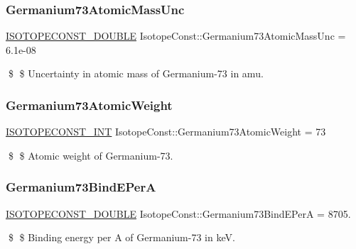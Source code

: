 \subsubsection{\texorpdfstring{Germanium73\+Atomic\+Mass\+Unc}{Germanium73AtomicMassUnc}}
{\footnotesize\ttfamily \mbox{\hyperlink{group___isotope_const-_macros_ga8f45a7272ce02c0b4c65c44636ed719a}{I\+S\+O\+T\+O\+P\+E\+C\+O\+N\+S\+T\+\_\+\+D\+O\+U\+B\+LE}} Isotope\+Const\+::\+Germanium73\+Atomic\+Mass\+Unc = 6.\+1e-\/08}

\$ \$ Uncertainty in atomic mass of Germanium-\/73 in amu. \mbox{\label{group___isotope_const-_germanium-_ge73_gabdd7a389fff0539b8e15b76e0ee2e50d}} 
\subsubsection{\texorpdfstring{Germanium73\+Atomic\+Weight}{Germanium73AtomicWeight}}
{\footnotesize\ttfamily \mbox{\hyperlink{group___isotope_const-_macros_ga5f18360b3e99483a35c32d789e62621c}{I\+S\+O\+T\+O\+P\+E\+C\+O\+N\+S\+T\+\_\+\+I\+NT}} Isotope\+Const\+::\+Germanium73\+Atomic\+Weight = 73}

\$ \$ Atomic weight of Germanium-\/73. \mbox{\label{group___isotope_const-_germanium-_ge73_gac28800ea3abc96fa5ad7c13a7cf3731f}} 
\subsubsection{\texorpdfstring{Germanium73\+Bind\+E\+PerA}{Germanium73BindEPerA}}
{\footnotesize\ttfamily \mbox{\hyperlink{group___isotope_const-_macros_ga8f45a7272ce02c0b4c65c44636ed719a}{I\+S\+O\+T\+O\+P\+E\+C\+O\+N\+S\+T\+\_\+\+D\+O\+U\+B\+LE}} Isotope\+Const\+::\+Germanium73\+Bind\+E\+PerA = 8705.}

\$ \$ Binding energy per A of Germanium-\/73 in keV. \mbox{\label{group___isotope_const-_germanium-_ge73_ga6bf2b4d1d06912e83b25bd2f7ab87a78}} 
